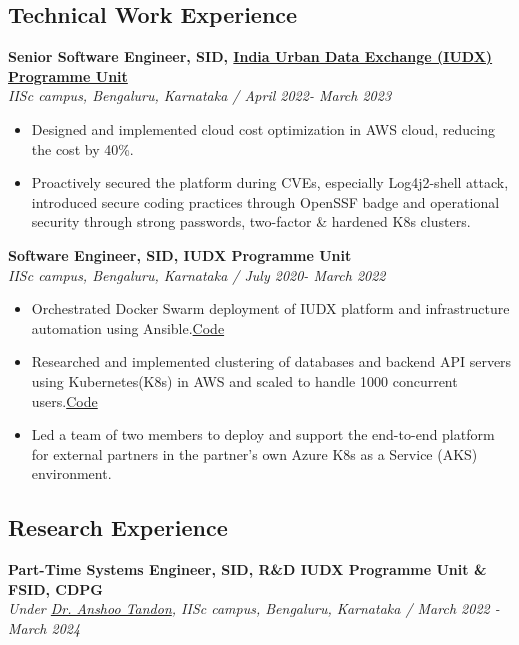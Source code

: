 \documentclass[a4paper,11pt]{article}
\begin{document}
\subsection*{Technical Work Experience}
\textbf{Senior Software Engineer, SID,  \href{https://iudx.org.in}{India Urban Data Exchange (IUDX) Programme Unit}} \\
\textit{IISc campus, Bengaluru, Karnataka / April 2022- March 2023} 
\begin{itemize}
\item Designed and implemented cloud cost optimization in AWS cloud, reducing the cost by 40\%.
\item  Proactively secured the platform during CVEs, especially Log4j2-shell attack, introduced secure coding practices through OpenSSF badge and operational security through strong passwords, two-factor \& hardened K8s clusters.
\end{itemize}
\textbf{Software Engineer, SID,  IUDX Programme Unit} \\
\textit{IISc campus, Bengaluru, Karnataka / July 2020- March 2022} 
\begin{itemize} 
\item Orchestrated Docker Swarm deployment of IUDX platform and infrastructure automation using Ansible.\href{https://github.com/datakaveri/iudx-deployment/tree/master/Docker-Swarm-deployment/single-node}{Code}  
\item Researched and implemented clustering of databases and backend API servers using Kubernetes(K8s) in AWS and scaled to handle 1000 concurrent users.\href{https://github.com/datakaveri/iudx-deployment/tree/v5.0.0/K8s-deployment}{Code}
\item Led a team of two members to deploy and support the end-to-end platform for external partners in the partner's own Azure K8s as a Service (AKS) environment. 
\end{itemize}


\subsection*{Research Experience}
\textbf{Part-Time Systems Engineer, SID,  R\&D IUDX Programme Unit \& FSID, CDPG} \\
\textit{Under \href{https://anshootandon.github.io/profile/}{Dr. Anshoo Tandon}, IISc campus, Bengaluru, Karnataka / March 2022 - March 2024}
\end{document}
